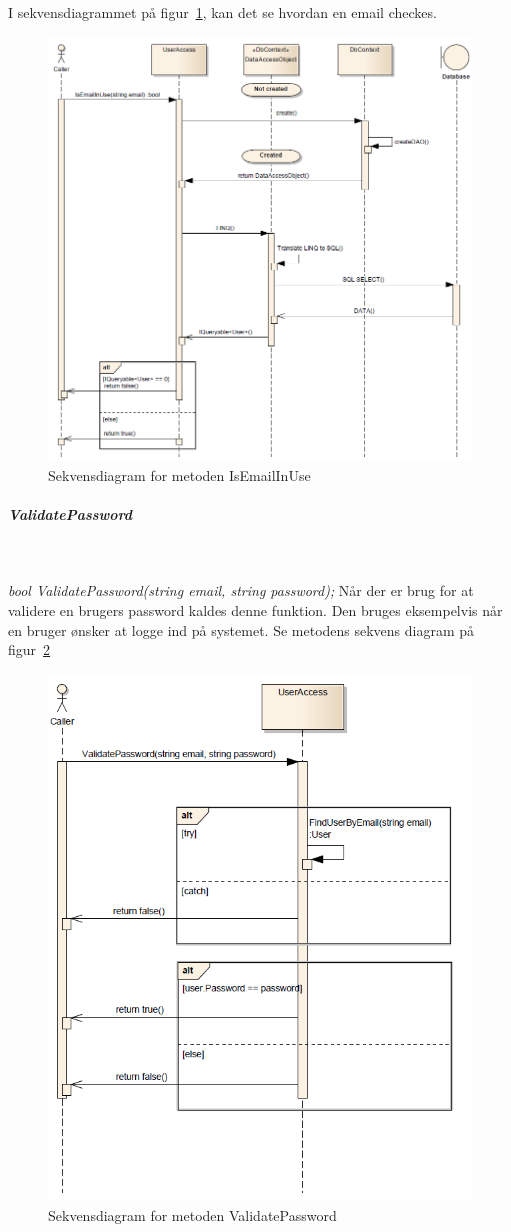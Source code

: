I sekvensdiagrammet på figur~\ref{fig:isEmailInUse}, kan det se hvordan en email checkes.

\begin{figure}[h]
\centering
\includegraphics[width=0.7\linewidth]{figs/dbSeq/isEmailInUse.PNG}
\caption{Sekvensdiagram for metoden IsEmailInUse}
\label{fig:isEmailInUse}
\end{figure}


\subparagraph{ValidatePassword}\

\textit{bool ValidatePassword(string email, string password);}
Når der er brug for at validere en brugers password kaldes denne funktion. Den bruges eksempelvis når en bruger ønsker at logge ind på systemet. Se metodens sekvens diagram på figur~\ref{fig:validatePassword}
	
\begin{figure}[h]
\centering
\includegraphics[width=0.7\linewidth]{figs/dbSeq/validatePassword.PNG}
\caption{Sekvensdiagram for metoden ValidatePassword}
\label{fig:validatePassword}
\end{figure}


